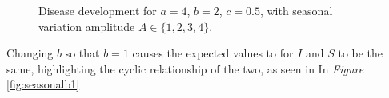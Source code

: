 \begin{figure}
    \caption{Disease development for $a=4$, $b=2$, $c=0.5$, with seasonal variation amplitude $A \in \{1,2,3,4\}$.}
    \label{fig:seasonalb2}
\end{figure}

Changing $b$ so that $b=1$ causes the expected values to for $I$ and $S$ to be the same, highlighting the cyclic relationship of the two, as seen in In \textit{Figure} \ref{fig:seasonalb1}

